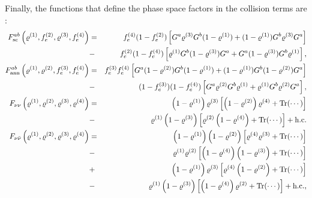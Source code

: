 \documentclass[notitlepage,showpacs,preprintnumbers,amsmath,amssymb,superscriptaddress,prd,onecolumn]{revtex4-1}
\begin{document}
Finally, the functions that define the phase space factors in the collision terms are \cite{deSalas:2016ztq,Bennett:inprep}:
\begin{eqnarray}
F_{\rm sc}^{ab}\left(\varrho^{(1)}, f_e^{(2)}, \varrho^{(3)}, f_e^{(4)}\right)
&=&
f_e^{(4)}(1-f_e^{(2)})\left[G^a\varrho^{(3)}G^b(1-\varrho^{(1)})+(1-\varrho^{(1)})G^b\varrho^{(3)}G^a\right]
\nonumber\\
&-&
f_e^{(2)}(1-f_e^{(4)})\left[\varrho^{(1)}G^b(1-\varrho^{(3)})G^a+G^a(1-\varrho^{(3)})G^b\varrho^{(1)}\right],
\label{eq:F_ab_sc}\\
F_{\rm ann}^{ab}\left(\varrho^{(1)}, \varrho^{(2)}, f_e^{(3)}, f_e^{(4)}\right)
&=&
f_e^{(3)}f_e^{(4)}\left[G^a(1-\varrho^{(2)})G^b(1-\varrho^{(1)})+(1-\varrho^{(1)})G^b(1-\varrho^{(2)})G^a\right]
\nonumber\\
&-&
(1-f_e^{(3)})(1-f_e^{(4)})\left[G^a\varrho^{(2)}G^b\varrho^{(1)}+\varrho^{(1)}G^b\varrho^{(2)}G^a\right],
\label{eq:F_ab_ann}
\\
F_{\nu\nu}\left(\varrho^{(1)}, \varrho^{(2)}, \varrho^{(3)}, \varrho^{(4)}\right)
&=&
\left(1-\varrho^{(1)}\right)\varrho^{(3)}
\left[\left(1-\varrho^{(2)}\right)\varrho^{(4)}+\mathrm{Tr}(\cdots)\right]
\nonumber\\
&-&
\varrho^{(1)}\left(1-\varrho^{(3)}\right)
\left[\varrho^{(2)}\left(1-\varrho^{(4)}\right)+\mathrm{Tr}(\cdots)\right]
+\mathrm{h.c.}
\label{eq:F_nunu}\\
F_{\nu\bar\nu}\left(\varrho^{(1)}, \varrho^{(2)}, \varrho^{(3)}, \varrho^{(4)}\right)
&=&
\left(1-\varrho^{(1)}\right)\left(1-\varrho^{(2)}\right)
\left[\varrho^{(4)}\varrho^{(3)}+\mathrm{Tr}(\cdots)\right]
\nonumber\\
&-&
\varrho^{(1)}\varrho^{(2)}
\left[\left(1-\varrho^{(4)}\right)\left(1-\varrho^{(3)}\right)+\mathrm{Tr}(\cdots)\right]
\nonumber\\
&+&
\left(1-\varrho^{(1)}\right)\varrho^{(3)}
\left[\varrho^{(4)}\left(1-\varrho^{(2)}\right)+\mathrm{Tr}(\cdots)\right]
\nonumber\\
&-&
\varrho^{(1)}\left(1-\varrho^{(3)}\right)
\left[\left(1-\varrho^{(4)}\right)\varrho^{(2)}+\mathrm{Tr}(\cdots)\right]
+\mathrm{h.c.},
\label{eq:F_nubarnu}
\end{eqnarray}
\end{document}
